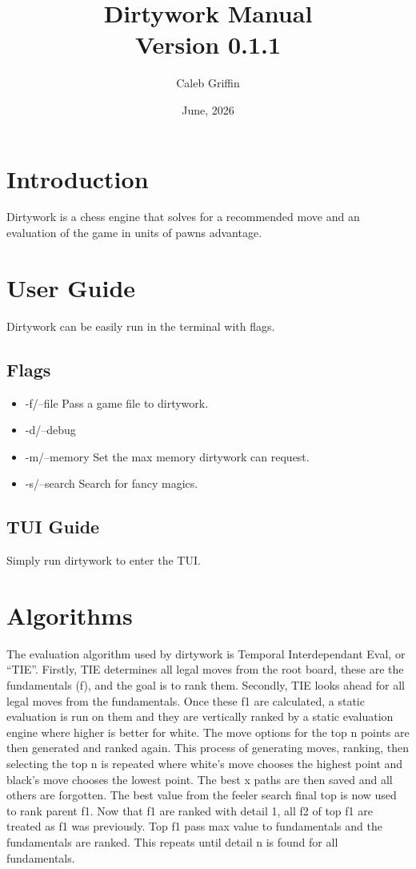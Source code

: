 \documentclass[12pt, letterpaper]{article}
\title{Dirtywork Manual\\[0.12in] \large Version 0.1.1}
\author{Caleb Griffin}
\date{June, 2026}
\begin{document}
\maketitle
\thispagestyle{empty}

\pagebreak
\tableofcontents
\pagebreak

\section{Introduction}
Dirtywork is a chess engine that solves for a recommended move and an evaluation of the game in units of pawns advantage.

\section{User Guide}
Dirtywork can be easily run in the terminal with flags.

\subsection{Flags}
\begin{itemize}
\item -f/--file Pass a game file to dirtywork.
\item -d/--debug
\item -m/--memory Set the max memory dirtywork can request.
\item -s/--search Search for fancy magics.
\end{itemize}

\subsection{TUI Guide}
Simply run dirtywork to enter the TUI.

\section{Algorithms}
The evaluation algorithm used by dirtywork is Temporal Interdependant Eval, or ``TIE''.
Firstly, TIE determines all legal moves from the root board, these are the fundamentals (f), and the goal is to rank them.
Secondly, TIE looks ahead for all legal moves from the fundamentals.
Once these f1 are calculated, a static evaluation is run on them and they are vertically ranked by a static evaluation engine where higher is better for white.
The move options for the top n points are then generated and ranked again.
This process of generating moves, ranking, then selecting the top n is repeated where white's move chooses the highest point and black's move chooses the lowest point.
The best x paths are then saved and all others are forgotten.
The best value from the feeler search final top is now used to rank parent f1.
Now that f1 are ranked with detail 1, all f2 of top f1 are treated as f1 was previously.
Top f1 pass max value to fundamentals and the fundamentals are ranked.
This repeats until detail n is found for all fundamentals.
\end{document}
